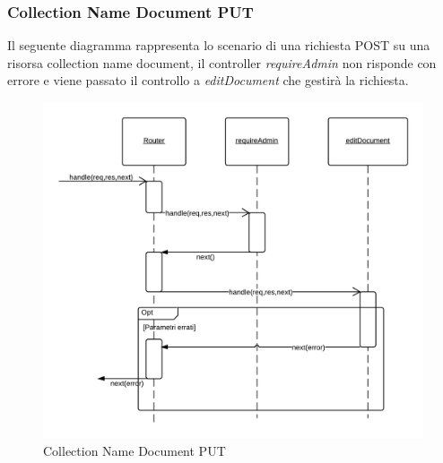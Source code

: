 \subsubsection{Collection Name Document PUT}
Il seguente diagramma rappresenta lo scenario di una richiesta POST su una risorsa collection name document, il controller \emph{requireAdmin} non risponde con errore e viene passato il controllo a \emph{editDocument} che gestirà la richiesta.
\begin{figure}[H]
	\begin{center} 
		\includegraphics[scale=0.20]{scenari/Collection Name Document PUT.png} 
		\caption{Collection Name Document PUT}
	\end{center} 
\end{figure}

